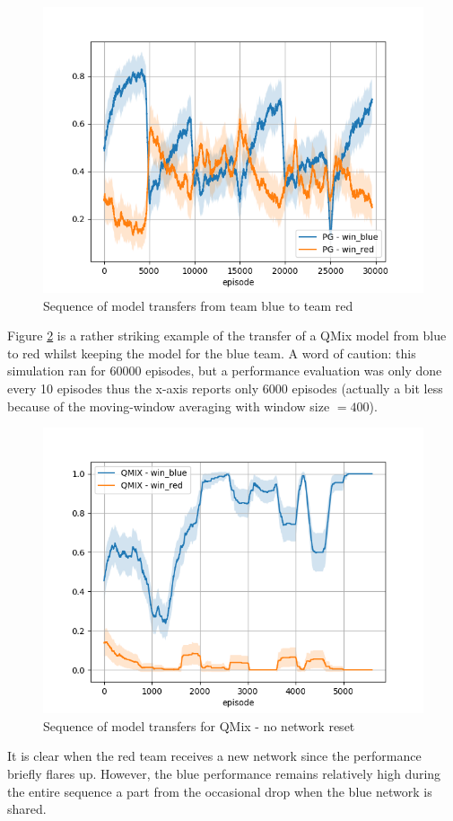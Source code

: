 \begin{figure}[htp]
    \centering
    \includegraphics[width=14cm]{images/iteration/iterative.png}
    \caption{Sequence of model transfers from team blue to team red}
    \label{fig:iteration}
\end{figure}
Figure \ref{fig:iterative_qmix} is a rather striking example of the transfer of a QMix model from blue to red whilst keeping the model for the blue team. A word of caution: this simulation ran for 60000 episodes, but a performance evaluation was only done every 10 episodes thus the x-axis reports only 6000 episodes (actually a bit less because of the moving-window averaging with window size $=400$).
\begin{figure}[htp]
    \centering
    \includegraphics[width=14cm]{images/iteration/iterative_qmix.png}
    \caption{Sequence of model transfers for QMix - no network reset}
    \label{fig:iterative_qmix}
\end{figure}
It is clear when the red team receives a new network since the performance briefly flares up. However, the blue performance remains relatively high during the entire sequence a part from the occasional drop when the blue network is shared.




